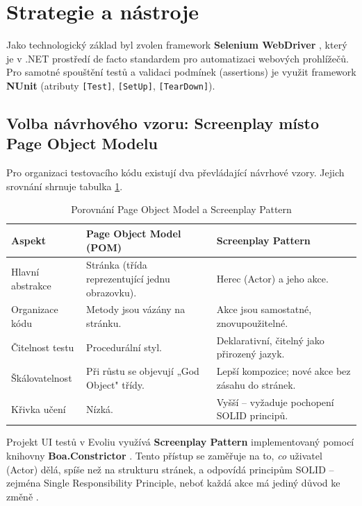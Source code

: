 \section{Strategie a nástroje}

Jako technologický základ byl zvolen framework \textbf{Selenium WebDriver} \cite{selenium_docs}, který je v .NET prostředí de facto standardem pro automatizaci webových prohlížečů. Pro samotné spouštění testů a validaci podmínek (assertions) je využit framework \textbf{NUnit} \cite{nunit_docs} (atributy \texttt{[Test]}, \texttt{[SetUp]}, \texttt{[TearDown]}).

\subsection{Volba návrhového vzoru: Screenplay místo Page Object Modelu}

Pro organizaci testovacího kódu existují dva převládající návrhové vzory. Jejich srovnání shrnuje tabulka \ref{tab:pom_vs_screenplay}.

\begin{table}[H]
\centering
\caption{Porovnání Page Object Model a Screenplay Pattern}
\label{tab:pom_vs_screenplay}
\begin{tabular}{|l|p{5cm}|p{5cm}|}
\hline
\textbf{Aspekt} & \textbf{Page Object Model (POM)} & \textbf{Screenplay Pattern} \\ \hline
Hlavní abstrakce & Stránka (třída reprezentující jednu obrazovku). & Herec (Actor) a jeho akce. \\ \hline
Organizace kódu & Metody jsou vázány na stránku. & Akce jsou samostatné, znovupoužitelné. \\ \hline
Čitelnost testu & Procedurální styl. & Deklarativní, čitelný jako přirozený jazyk. \\ \hline
Škálovatelnost & Při růstu se objevují „God Object" třídy. & Lepší kompozice; nové akce bez zásahu do stránek. \\ \hline
Křivka učení & Nízká. & Vyšší -- vyžaduje pochopení SOLID principů. \\ \hline
\end{tabular}
\end{table}

Projekt UI testů v Evoliu využívá \textbf{Screenplay Pattern} \cite{knight_screenplay} implementovaný pomocí knihovny \textbf{Boa.Constrictor} \cite{boa_constrictor}. Tento přístup se zaměřuje na to, \emph{co} uživatel (Actor) dělá, spíše než na strukturu stránek, a odpovídá principům SOLID -- zejména Single Responsibility Principle, neboť každá akce má jediný důvod ke změně \cite{martin_clean_architecture}.

